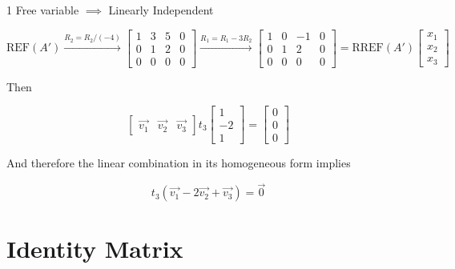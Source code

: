 \documentclass{report}
\begin{document}
1 Free variable $\implies$ Linearly Independent

\[
	\text{REF}(A')
	\xrightarrow{R_2 = R_2 / (-4)}
	\begin{bmatrix}
		1 & 3 & 5 & 0 \\
		0 & 1 & 2 & 0 \\
		0 & 0 & 0 & 0
	\end{bmatrix}
	\xrightarrow{R_1 = R_1 - 3R_2}
	\begin{bmatrix}
		1 & 0 & -1 & 0 \\
		0 & 1 & 2  & 0 \\
		0 & 0 & 0  & 0
	\end{bmatrix}
	= \text{RREF}(A')
	\begin{bmatrix}
		x_1 \\
		x_2 \\
		x_3
	\end{bmatrix}
\]

Then

\[
	\begin{bmatrix}
		\vec{v_1} & \vec{v_2} & \vec{v_3}
	\end{bmatrix}
	t_3
	\begin{bmatrix}
		1 \\-2\\1
	\end{bmatrix}
	=
	\begin{bmatrix}
		0 \\0\\0
	\end{bmatrix}
\]

And therefore the linear combination in its homogeneous form implies

\[
	t_3 (\vec{v_1} - 2\vec{v_2} + \vec{v_3}) = \vec{0}
\]

\section{Identity Matrix}

\end{document}
